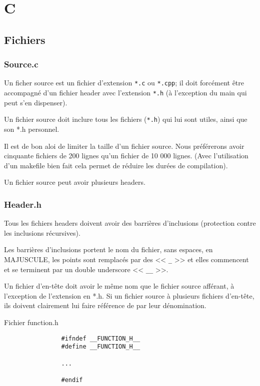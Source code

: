 \chapter{C}
	

	\section{Fichiers}
		\subsection{Source.c}
			Un ficher source est un fichier d'extension \verb+*.c+ ou \verb+*.cpp+; il doit forcément être accompagné d'un fichier header avec l'extension \verb+*.h+ (à l'exception du main qui peut s'en dispenser).

			Un fichier source doit inclure tous les fichiers (\verb+*.h+) qui lui sont utiles, ainsi que son *.h personnel.

			Il est de bon aloi de limiter la taille d'un fichier source. Nous préférerons avoir cinquante fichiers de 200 lignes qu'un fichier de 10 000 lignes. (Avec l'utilisation d'un makefile bien fait cela permet de réduire les durées de compilation).

			Un fichier source peut avoir plusieurs headers.

		\subsection{Header.h}
			Tous les fichiers headers doivent avoir des barrières d'inclusions (protection contre les inclusions récursives).
			
			Les barrières d'inclusions portent le nom du fichier, sans espaces, en MAJUSCULE, les points sont remplacés par des << \verb+_+ >> et elles commencent et se terminent par un double underscore << \verb+__+ >>.
		
			Un fichier d'en-tête doit avoir le même nom que le fichier source afférant, à l'exception de l'extension en *.h. Si un fichier source à plusieurs fichiers d'en-tête, ils doivent clairement lui faire référence de par leur dénomination.
			
			\begin{cbox}{Fichier function.h}
				\begin{verbatim}
				#ifndef __FUNCTION_H__
				#define __FUNCTION_H__

				...

				#endif
				\end{verbatim}
			\end{cbox}

